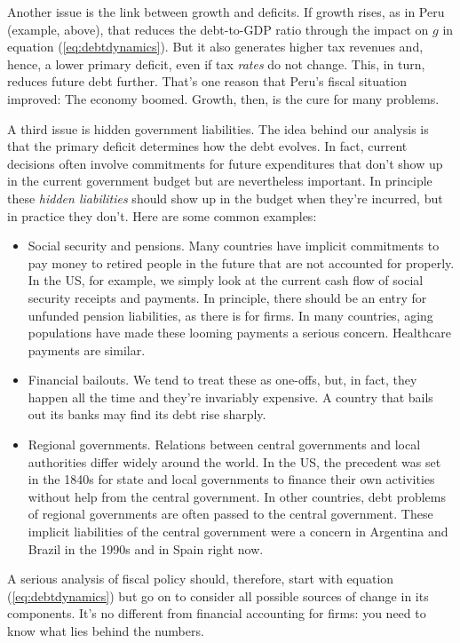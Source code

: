 Another issue is the link between growth and deficits.
If growth rises, as in Peru (example, above),
that reduces the debt-to-GDP ratio through
the impact on $g$ in equation (\ref{eq:debtdynamics}).
But it also generates higher tax revenues and, hence,
a lower primary deficit, even if tax {\it rates\/}
do not change.
This, in turn, reduces future debt further.
That's one reason that Peru's fiscal situation improved:
The economy boomed.
Growth, then, is the cure for many problems.

A third issue is hidden government liabilities.
The idea behind our analysis
is that the primary deficit determines how the debt evolves.
In fact, current decisions often involve commitments
for future expenditures that don't show up in the
current government budget but are nevertheless important.
In principle these {\it hidden liabilities\/}
should show up in the budget when they're incurred,
but in practice they don't.
Here are some common examples:
%
\begin{itemize}
\item Social security and pensions.
Many countries have implicit commitments to pay
money to retired people in the future
that are not accounted for properly.
In the US, for example, we simply look at the current cash flow of
social security receipts and payments.
In principle, there should be an entry for unfunded pension
liabilities,
as there is for firms.
In many countries, aging populations have made these looming payments
a serious concern.
Healthcare payments are similar.

\item Financial bailouts.
We tend to treat these as one-offs, but, in fact, they happen all the time and they're invariably expensive.
A country that bails out its banks may find its debt rise sharply.

\item Regional governments.
Relations between central governments and local authorities
differ widely around the world.
In the US, the precedent was set in the 1840s for state and local
governments to finance their own activities without help from
the central government.
In other countries, debt problems of regional governments are often
passed to the central government.
These implicit liabilities of the central government were a concern in
Argentina and Brazil in the 1990s and in Spain right now.

\end{itemize}

A serious analysis of fiscal policy should, therefore,
start with equation (\ref{eq:debtdynamics})
but go on to consider all possible sources of change in its components.
It's no different from financial accounting for firms:
you need to know what lies behind the numbers.


